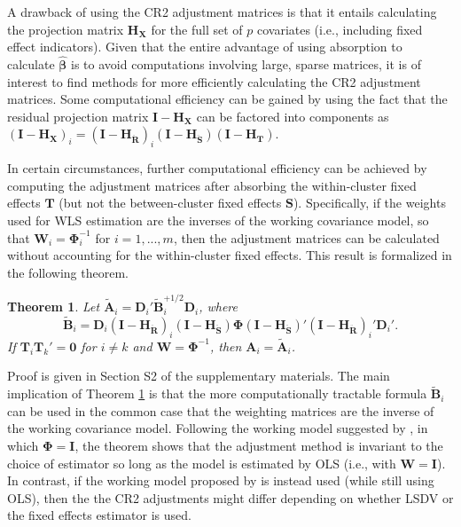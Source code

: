 \documentclass[12pt]{article}\usepackage[]{graphicx}\usepackage[]{color}
\newtheorem{thm}{Theorem}
\newcommand{\bm}{\mathbf}
\newcommand{\bs}{\boldsymbol}
\begin{document}
A drawback of using the CR2 adjustment matrices is that it entails calculating the projection matrix $\bm{H_X}$ for the full set of $p$ covariates (i.e., including fixed effect indicators). 
Given that the entire advantage of using absorption to calculate $\hat{\bs\beta}$ is to avoid computations involving large, sparse matrices, it is of interest to find methods for more efficiently calculating the CR2 adjustment matrices. 
Some computational efficiency can be gained by using the fact that the residual projection matrix $\bm{I} - \bm{H_X}$ can be factored into components as $\left(\bm{I} - \bm{H_X}\right)_i = \left(\bm{I} - \bm{H_{\ddot{R}}}\right)_i \left(\bm{I} - \bm{H_{\ddot{S}}}\right) \left(\bm{I} - \bm{H_T}\right)$.

In certain circumstances, further computational efficiency can be achieved by computing the adjustment matrices after absorbing the within-cluster fixed effects $\bm{T}$ (but not the between-cluster fixed effects $\bm{S}$). 
Specifically, if the weights used for WLS estimation are the inverses of the working covariance model, so that $\bm{W}_i = \bs\Phi_i^{-1}$ for $i = 1,...,m$, then the adjustment matrices can be calculated without accounting for the within-cluster fixed effects. 
This result is formalized in the following theorem.  

\begin{thm}
\label{thm:absorb}
Let $\bm{\tilde{A}}_i = \bm{D}_i'\bm{\tilde{B}}_i^{+1/2} \bm{D}_i$, where 
\begin{equation}
\label{eq:CR2_B_tilde}
\bm{\tilde{B}}_i = \bm{D}_i\left(\bm{I} - \bm{H_{\ddot{R}}}\right)_i \left(\bm{I} - \bm{H_{\ddot{S}}}\right) \bs\Phi \left(\bm{I} - \bm{H_{\ddot{S}}}\right)' \left(\bm{I} - \bm{H_{\ddot{R}}}\right)_i' \bm{D}_i'.
\end{equation}
If $\bm{T}_i \bm{T}_k' = \bm{0}$ for $i \neq k$ and $\bm{W} = \bs\Phi^{-1}$, then $\bm{A}_i = \bm{\tilde{A}}_i$. 
\end{thm}

Proof is given in Section S2 of the supplementary materials.
The main implication of Theorem \ref{thm:absorb} is that the more computationally tractable formula $\bm{\tilde{B}}_i$ can be used in the common case that the weighting matrices are the inverse of the working covariance model.
Following the working model suggested by \citet{Bell2002bias}, in which $\bs\Phi = \bm{I}$, the theorem shows that the adjustment method is invariant to the choice of estimator so long as the model is estimated by OLS (i.e., with $\bm{W} = \bm{I}$).
In contrast, if the working model proposed by \citet{Imbens2015robust} is instead used (while still using OLS), then the the CR2 adjustments might differ depending on whether LSDV or the fixed effects estimator is used.
\end{document}
